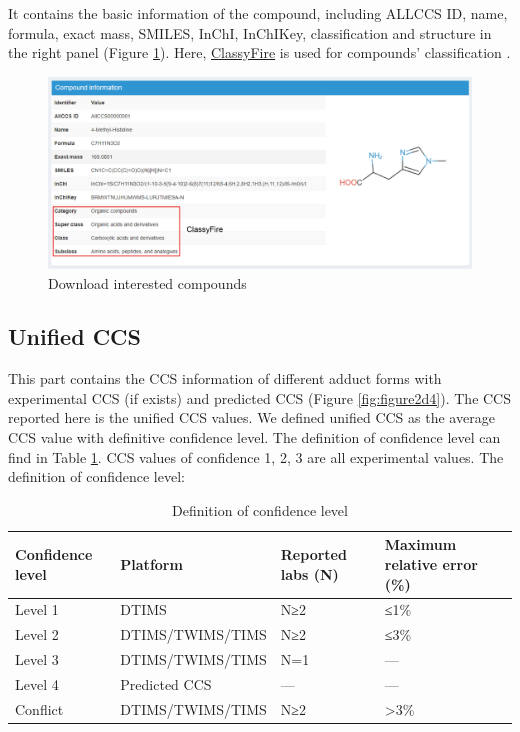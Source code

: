 \documentclass[12pt,]{book}
\theoremstyle{definition}
\theoremstyle{definition}
\theoremstyle{definition}
\theoremstyle{remark}
\begin{document}
It contains the basic information of the compound, including ALLCCS ID,
name, formula, exact mass, SMILES, InChI, InChIKey, classification and
structure in the right panel (Figure \ref{fig:figure2d3}). Here,
\href{http://classyfire.wishartlab.com}{ClassyFire} is used for
compounds' classification \citep{reference8}.

\begin{figure}

{\centering \includegraphics{images/chapter2/figure2.3compound_card_information} 

}

\caption{Download interested compounds}\label{fig:figure2d3}
\end{figure}

\subsection{Unified CCS}\label{chapter2d2d2}

This part contains the CCS information of different adduct forms with
experimental CCS (if exists) and predicted CCS (Figure
\ref{fig:figure2d4}). The CCS reported here is the unified CCS values.
We defined unified CCS as the average CCS value with definitive
confidence level. The definition of confidence level can find in Table
\ref{tab:table2d2}. CCS values of confidence 1, 2, 3 are all
experimental values. The definition of confidence level:

\begin{table}

\caption{\label{tab:table2d2}Definition of confidence level}
\centering
\begin{tabular}[t]{llll}
\toprule
Confidence level & Platform & Reported labs (N) & Maximum relative error (\%)\\
\midrule
Level 1 & DTIMS & N≥2 & ≤1\%\\
Level 2 & DTIMS/TWIMS/TIMS & N≥2 & ≤3\%\\
Level 3 & DTIMS/TWIMS/TIMS & N=1 & ---\\
Level 4 & Predicted CCS & --- & ---\\
Conflict & DTIMS/TWIMS/TIMS & N≥2 & >3\%\\
\bottomrule
\end{tabular}
\end{table}
\end{document}
